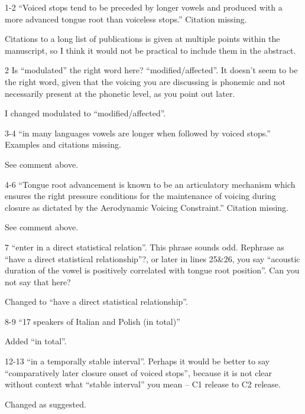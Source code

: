 \documentclass[]{article}
\begin{document}
1-2 ``Voiced stops tend to be preceded by longer vowels and produced
with a more advanced tongue root than voiceless stops.'' Citation
missing.

\color{plum}

Citations to a long list of publications is given at multiple points
within the manuscript, so I think it would not be practical to include
them in the abstract. \color{black}

2 Is ``modulated'' the right word here? ``modified/affected''. It
doesn't seem to be the right word, given that the voicing you are
discussing is phonemic and not necessarily present at the phonetic
level, as you point out later.

\color{plum}

I changed modulated to ``modified/affected''. \color{black}

3-4 ``in many languages vowels are longer when followed by voiced
stops.'' Examples and citations missing.

\color{plum}

See comment above. \color{black}

4-6 ``Tongue root advancement is known to be an articulatory mechanism
which ensures the right pressure conditions for the maintenance of
voicing during closure as dictated by the Aerodynamic Voicing
Constraint.'' Citation missing.

\color{plum}

See comment above. \color{black}

7 ``enter in a direct statistical relation''. This phrase sounds odd.
Rephrase as ``have a direct statistical relationship''?, or later in
lines 25\&26, you say ``acoustic duration of the vowel is positively
correlated with tongue root position''. Can you not say that here?

\color{plum}

Changed to ``have a direct statistical relationship''. \color{black}

8-9 ``17 speakers of Italian and Polish (in total)''

\color{plum}

Added ``in total''. \color{black}

12-13 ``in a temporally stable interval''. Perhaps it would be better to
say ``comparatively later closure onset of voiced stops'', because it is
not clear without context what ``stable interval'' you mean -- C1
release to C2 release.

\color{plum}

Changed as suggested. \color{black}
\end{document}
